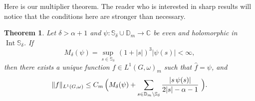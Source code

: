 \documentclass[12pt,a4paper]{amsart}
\newtheorem{thm}{Theorem}[section]
\theoremstyle{definition}
\theoremstyle{remark}
\numberwithin{equation}{section}
\newcommand{\Int}{\operatorname{Int}}
\newcommand{\C}{\mathbb{C}}
\newcommand{\Strip}{\mathbb{S}}
\newcommand{\Discr}{\mathbb{D}_m}
\newcommand{\eb}{\mathbf{e}}
\newcommand{\var}{s}
\begin{document}


\color{black}

Here is our multiplier theorem. 
The reader who is interested in sharp results will notice that the conditions here are stronger than necessary.
\begin{thm}\label{molt1} 
Let $\delta>\alpha+1$ and $\psi \colon \Strip_\delta \cup \Discr\longrightarrow \C$ be  even and  holomorphic in  $\Int \Strip_\delta$.
If
\[%
M_\delta (\psi)= \sup_{\var \in \Strip_\delta}\,(1+|\var |)^{3} |  \psi (\var ) |<\infty,
\]
then there exists a unique function $f\in L^1(G,\omega)_m$ such that $\hat f=\psi$, and
\[
\|f\|_{L^1(G,\omega)}\leq  C_m \, \Bigl(M_\delta(\psi)+
\sum_{\var\in \Discr\setminus \Strip_\delta}  \frac{ |\var\,\psi(\var)|}{2|\var|-\alpha-1}\,\,
\Bigr).
\]
\end{thm}
\end{document}
